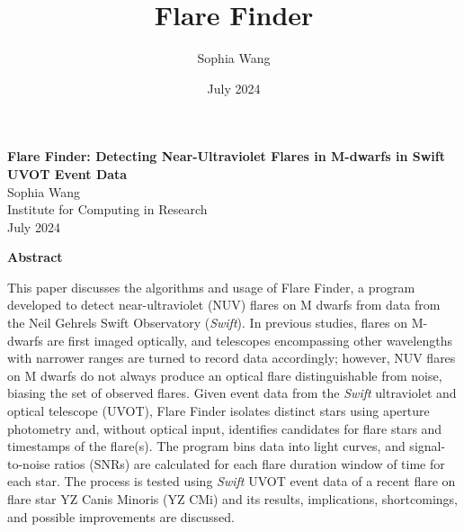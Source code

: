 \documentclass{article}
\title{Flare Finder}
\author{Sophia Wang}
\date{July 2024}
\begin{document}
\begin{center}
    \Large
    \textbf{Flare Finder: Detecting Near-Ultraviolet Flares in M-dwarfs in Swift UVOT Event Data} \\
    \vspace{1cm}
    \large
    Sophia Wang \\
    Institute for Computing in Research \\
    July 2024 \\
    \vspace{1cm}
    
    \Large
    \textbf{Abstract}
    
\end{center}
This paper discusses the algorithms and usage of Flare Finder, a program developed to detect near-ultraviolet (NUV) flares on M dwarfs from data from the Neil Gehrels Swift Observatory (\textit{Swift}). In previous studies, flares on M-dwarfs are first imaged optically, and telescopes encompassing other wavelengths with narrower ranges are turned to record data accordingly; however, NUV flares on M dwarfs do not always produce an optical flare distinguishable from noise, biasing the set of observed flares. Given event data from the \textit{Swift} ultraviolet and optical telescope (UVOT), Flare Finder isolates distinct stars using aperture photometry and, without optical input, identifies candidates for flare stars and timestamps of the flare(s). The program bins data into light curves, and signal-to-noise ratios (SNRs) are calculated for each flare duration window of time for each star. The process is tested using \textit{Swift} UVOT event data of a recent flare on flare star YZ Canis Minoris (YZ CMi) and its results, implications, shortcomings, and possible improvements are discussed.

\vspace{1cm}
\end{document}
